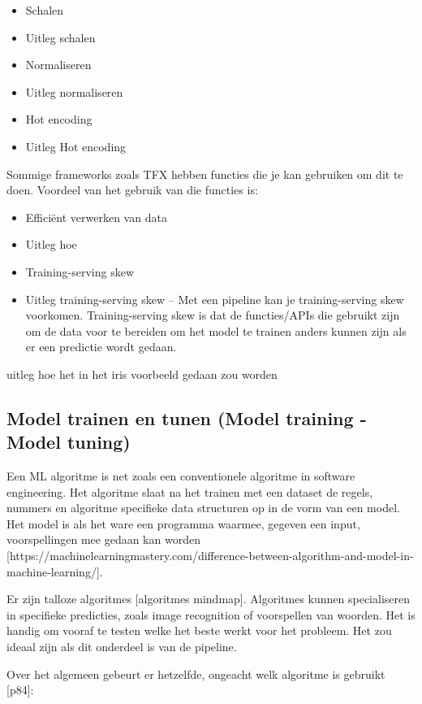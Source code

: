 \begin{itemize}
  \item Schalen
  \item[] Uitleg schalen
  \item Normaliseren
  \item[] Uitleg normaliseren
  \item Hot encoding
  \item[] Uitleg Hot encoding
\end{itemize}

Sommige frameworks zoals TFX hebben functies die je kan gebruiken om dit te doen. Voordeel van het gebruik van die functies is:

\begin{itemize}
  \item Efficiënt verwerken van data
  \item[] Uitleg hoe
  \item Training-serving skew
  \item[] Uitleg training-serving skew -- Met een pipeline kan je training-serving skew voorkomen. Training-serving skew is dat de functies/APIs die gebruikt zijn om de data voor te bereiden om het model te trainen anders kunnen zijn als er een predictie wordt gedaan.
\end{itemize}

uitleg hoe het in het iris voorbeeld gedaan zou worden 

\subsection{Model trainen en tunen (Model training - Model tuning)}\label{subsec:model-trainen-en-tunen}
Een ML algoritme is net zoals een conventionele algoritme in software engineering. Het algoritme slaat na het trainen met een dataset de regels, nummers en algoritme specifieke data structuren op in de vorm van een model. Het model is als het ware een programma waarmee, gegeven een input, voorspellingen mee gedaan kan worden [https://machinelearningmastery.com/difference-between-algorithm-and-model-in-machine-learning/].

Er zijn talloze algoritmes [algoritmes mindmap]. Algoritmes kunnen specialiseren in specifieke predicties, zoals image recognition of voorspellen van woorden. Het is handig om vooraf te testen welke het beste werkt voor het probleem. Het zou ideaal zijn als dit onderdeel is van de pipeline.

Over het algemeen gebeurt er hetzelfde, ongeacht welk algoritme is gebruikt [p84]:

